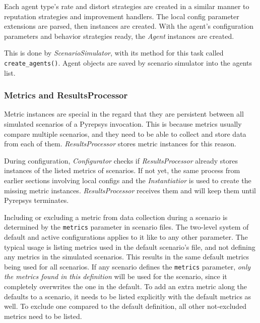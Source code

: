 \documentclass[%
    ]{\PathToTumTemplate/thesis/tum_thesis}
\begin{document}
Each agent type's rate and distort strategies are created in a similar manner to reputation strategies and improvement handlers.
The local config parameter extensions are parsed, then instances are created.
With the agent's configuration parameters and behavior strategies ready, the \emph{Agent} instances are created.

This is done by \emph{ScenarioSimulator}, with its method for this task called \lstinline{create_agents()}.
Agent objects are saved by scenario simulator into the agents list.

\subsubsection{Metrics and ResultsProcessor}
Metric instances are special in the regard that they are persistent between all simulated scenarios of a Pyrepsys invocation.
This is because metrics usually compare multiple scenarios, and they need to be able to collect and store data from each of them.
\emph{ResultsProcessor} stores metric instances for this reason.

During configuration, \emph{Configurator} checks if \emph{ResultsProcessor} already stores instances of the listed metrics of scenarios.
If not yet, the same process from earlier sections involving local configs and the \emph{Instantiatior} is used to create the missing metric instances.
\emph{ResultsProcessor} receives them and will keep them until Pyrepsys terminates.

Including or excluding a metric from data collection during a scenario is determined by the \lstinline{metrics} parameter in scenario files.
The two-level system of default and active configurations applies to it like to any other parameter.
The typical usage is listing metrics used in the default scenario's file, and not defining any metrics in the simulated scenarios.
This results in the same default metrics being used for all scenarios.
If any scenario defines the \lstinline{metrics} parameter, \emph{only the metrics found in this definition} will be used for the scenario, since it completely overwrites the one in the default.
To add an extra metric along the defaults to a scenario, it needs to be listed explicitly with the default metrics as well.
To exclude one compared to the default definition, all other not-excluded metrics need to be listed.



\end{document}
